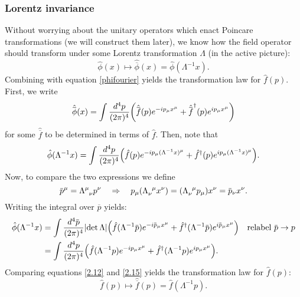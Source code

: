 \documentclass{article}
\begin{document}
\subsubsection{Lorentz invariance}
Without worrying about the unitary operators which enact Poincare transformations (we will construct them later), we know how the field operator should transform under some Lorentz transformation $ \Lambda $ (in the active picture):
\begin{equation}
	\hat{\phi}(x) \longmapsto \hat{\overbar{\phi}}(x) = \hat{\phi}(\Lambda^{-1} x).
\end{equation}
Combining with equation \eqref{phifourier} yields the transformation law for $ \hat{f}(p) $. First, we write
\begin{equation} \label{2.12}
	\hat{\overbar{\phi}}(x) = \int \frac{\dd[4]{p}}{(2\pi)^{4}} \qty(\hat{\overbar{f}}(p) e^{-ip_{\mu} x^{\mu}} + \hat{\overbar{f}}^{\dagger}(p) e^{ip_{\mu} x^{\mu}})
\end{equation}
for some $ \hat{\overbar{f}} $ to be determined in terms of $ \hat{f} $. Then, note that
\begin{equation}
	\hat{\phi}(\Lambda^{-1} x) = \int \frac{\dd[4]{p}}{(2\pi)^{4}} \qty(\hat{f}(p) e^{-ip_{\mu} (\Lambda^{-1} x)^{\mu}} + \hat{f}^{\dagger}(p) e^{ip_{\mu} (\Lambda^{-1} x)^{\mu}}).
\end{equation}
Now, to compare the two expressions we define
\begin{equation}
	\overbar{p}^{\mu} = \lrz{\mu}{\nu} p^{\nu} \implies p_{\mu} \qty(\ilrz{\nu}{\mu} x^{\nu}) = \qty(\ilrz{\nu}{\mu} p_{\mu}) x^{\nu} = \overbar{p}_{\nu} x^{\nu}.
\end{equation}
Writing the integral over $ \overbar{p} $ yields:
\begin{align}
	\begin{split} \label{2.15}
	\hat{\phi} (\Lambda^{-1} x) &= \int \frac{\dd[4]{\overbar{p}}}{(2\pi)^{4}} \abs{\det \Lambda} \qty( \hat{f}(\Lambda^{-1} \overbar{p}) e^{-i \overbar{p}_{\mu} x^{\mu}} + \hat{f}^{\dagger}(\Lambda^{-1} \overbar{p}) e^{i \overbar{p}_{\mu} x^{\mu}}) \quad \text{relabel $ \overbar{p} \to p $} \\
	&= \int \frac{\dd[4]{p}}{(2\pi)^{4}} \qty( \hat{f}(\Lambda^{-1} p) e^{-ip_{\mu} x^{\mu}} + \hat{f}^{\dagger}(\Lambda^{-1} p) e^{ip_{\mu} x^{\mu}} ).
	\end{split}
\end{align}
Comparing equations \eqref{2.12} and \eqref{2.15} yields the transformation law for $ \hat{f}(p) $:
\begin{equation}
	\hat{f}(p) \longmapsto \hat{\overbar{f}}(p) = \hat{f}(\Lambda^{-1} p).
\end{equation}
\end{document}

